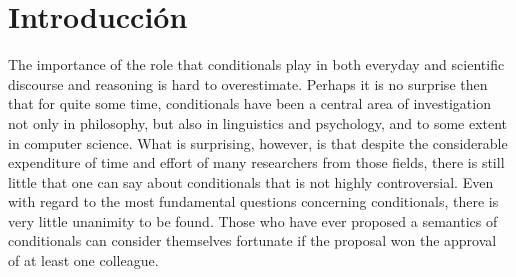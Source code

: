 \chapter*{Introducción}

\noindent The importance of the role that conditionals play in both everyday and scientific discourse and reasoning is hard to overestimate.
Perhaps it is no surprise then that for quite some time, conditionals have been a central area of investigation not only in philosophy, but also in linguistics and psychology, and to some extent in computer science.
What is surprising, however, is that despite the considerable expenditure of time and effort of many researchers from those fields, there is still little that one can say about conditionals that is not highly controversial. 
Even with regard to the most fundamental questions concerning conditionals, there is very little unanimity to be found. 
Those who have ever proposed a semantics of conditionals can consider themselves fortunate if the proposal won the approval of at least one colleague. %